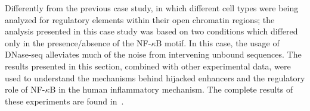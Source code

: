 Differently from the previous case study, in which different cell types were being analyzed for regulatory elements within their open chromatin regions; the analysis presented in this case study was based on two conditions which differed only in the presence/absence of the NF-$\kappa$B motif. In this case, the usage of DNase-seq alleviates much of the noise from intervening unbound sequences. The results presented in this section, combined with other experimental data, were used to understand the mechanisms behind hijacked enhancers and the regulatory role of NF-$\kappa$B in the human inflammatory mechanism. The complete results of these experiments are found in~\cite{kolovos2016}.



